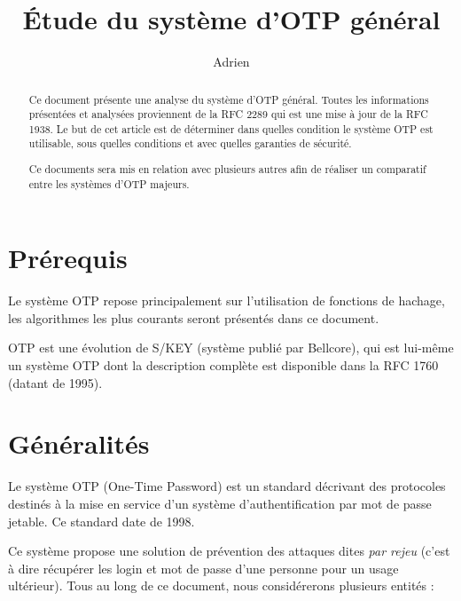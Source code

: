 \documentclass{../res/univ-projet}
\title{\'Etude du syst\`eme d'OTP g\'en\'eral}
\author{Adrien \bsc{Smondack}}
\begin{document}
\maketitle

\begin{abstract}
  Ce document présente une analyse du système d'OTP général. Toutes les 
informations présentées et analysées proviennent de la RFC 2289 qui est une mise à jour
de la RFC 1938. Le but de cet 
article est de déterminer dans quelles condition le système OTP est utilisable, 
sous quelles conditions et avec quelles garanties de sécurité.
  
  Ce documents sera mis en relation avec plusieurs autres afin de réaliser un 
comparatif entre les systèmes d'OTP majeurs.
\end{abstract}
\newpage
\tableofcontents
\newpage

\section{Prérequis}
  Le système OTP repose principalement sur l'utilisation de fonctions de 
  hachage, les algorithmes les plus courants seront présentés dans ce 
  document.

  OTP est une évolution de S/KEY (système publié par Bellcore), qui est 
  lui-même un système OTP dont la description complète est disponible
  dans la RFC 1760 (datant de 1995).

\section{Généralités}
  Le système OTP (One-Time Password) est un standard décrivant des protocoles 
destinés à la mise en service d'un système d'authentification par mot de passe 
jetable. Ce standard date de 1998.

  Ce système propose une solution de prévention des attaques dites \emph{par 
rejeu} (c'est à dire récupérer les login et mot de passe d'une personne pour un 
usage ultérieur). Tous au long de ce document, nous considérerons plusieurs 
entités :
\end{document}
